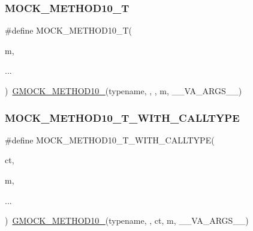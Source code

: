 \mbox{\label{_obj__test_2lib_2googletest-release-1_88_81_2googlemock_2include_2gmock_2gmock-generated-function-mockers_8h_aa28723ba52933b5ea9a4ffa1a73d15e1}} 
\subsubsection{\texorpdfstring{MOCK\_METHOD10\_T}{MOCK\_METHOD10\_T}}
{\footnotesize\ttfamily \#define M\+O\+C\+K\+\_\+\+M\+E\+T\+H\+O\+D10\+\_\+T(\begin{DoxyParamCaption}\item[{}]{m,  }\item[{}]{... }\end{DoxyParamCaption})~\mbox{\hyperlink{_obj__test_2lib_2googletest-release-1_88_81_2googlemock_2include_2gmock_2gmock-generated-function-mockers_8h_a81a48223a8771de36ef92ac6d56f6e81}{G\+M\+O\+C\+K\+\_\+\+M\+E\+T\+H\+O\+D10\+\_\+}}(typename, , , m, \+\_\+\+\_\+\+V\+A\+\_\+\+A\+R\+G\+S\+\_\+\+\_\+)}

\mbox{\label{_obj__test_2lib_2googletest-release-1_88_81_2googlemock_2include_2gmock_2gmock-generated-function-mockers_8h_ae0460a593b7868a5573117032d6d2e3e}} 
\subsubsection{\texorpdfstring{MOCK\_METHOD10\_T\_WITH\_CALLTYPE}{MOCK\_METHOD10\_T\_WITH\_CALLTYPE}}
{\footnotesize\ttfamily \#define M\+O\+C\+K\+\_\+\+M\+E\+T\+H\+O\+D10\+\_\+\+T\+\_\+\+W\+I\+T\+H\+\_\+\+C\+A\+L\+L\+T\+Y\+PE(\begin{DoxyParamCaption}\item[{}]{ct,  }\item[{}]{m,  }\item[{}]{... }\end{DoxyParamCaption})~\mbox{\hyperlink{_obj__test_2lib_2googletest-release-1_88_81_2googlemock_2include_2gmock_2gmock-generated-function-mockers_8h_a81a48223a8771de36ef92ac6d56f6e81}{G\+M\+O\+C\+K\+\_\+\+M\+E\+T\+H\+O\+D10\+\_\+}}(typename, , ct, m, \+\_\+\+\_\+\+V\+A\+\_\+\+A\+R\+G\+S\+\_\+\+\_\+)}

